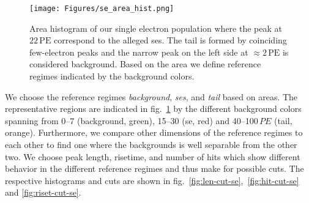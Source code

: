 \begin{figure}
    \centering
    \texttt{[image: Figures/se\_area\_hist.png]}  %
    \caption[Histogram Area Single Electrons and Background]{
        Area histogram of our single electron population where the peak at $ 22\,\mathrm{PE} $ correspond to the alleged \glspl{se}.
        The tail is formed by coinciding few-electron peaks and the narrow peak on the left side at $ \approx 2\,\mathrm{PE} $ is considered background.
        Based on the area we define reference regimes indicated by the background colors.
    }
    \label{fig:se-area-hist}
\end{figure}


We choose the reference regimes \emph{background}, \emph{\glspl{se}}, and \emph{tail} based on areas.
The representative regions are indicated in fig.~\ref{fig:se-area-hist} by the different background colors spanning from \numrange{0}{7} (background, green), \numrange{15}{30} (\gls{se}, red) and \numrange{40}{100}$ \,\mathit{PE} $ (tail, orange).
Furthermore, we compare other dimensions of the reference regimes to each other to find one where the backgrounds is well separable from the other two.
We choose peak length, risetime, and number of hits which show different behavior in the different reference regimes and thus make for possible cuts.
The respective histograms and cuts are shown in fig.~\ref{fig:len-cut-se},~\ref{fig:hit-cut-se} and \ref{fig:riset-cut-se}.






